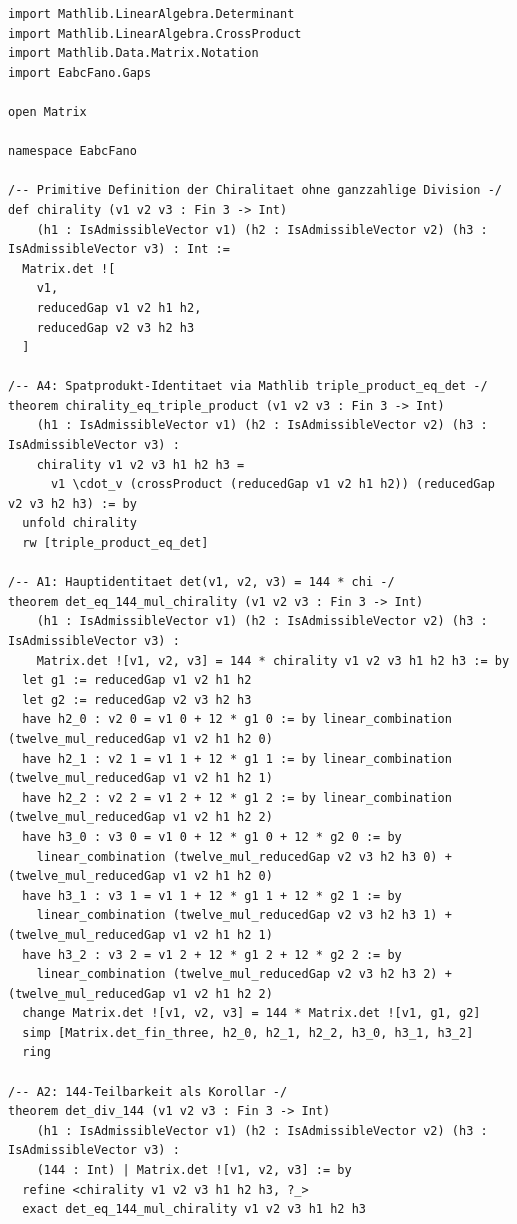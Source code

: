 \documentclass[11pt,a4paper]{article}
\theoremstyle{plain}
\theoremstyle{definition}
\theoremstyle{remark}
\begin{document}
\begin{lstlisting}[language=Lean4]
import Mathlib.LinearAlgebra.Determinant
import Mathlib.LinearAlgebra.CrossProduct
import Mathlib.Data.Matrix.Notation
import EabcFano.Gaps

open Matrix

namespace EabcFano

/-- Primitive Definition der Chiralitaet ohne ganzzahlige Division -/
def chirality (v1 v2 v3 : Fin 3 -> Int)
    (h1 : IsAdmissibleVector v1) (h2 : IsAdmissibleVector v2) (h3 : IsAdmissibleVector v3) : Int :=
  Matrix.det ![
    v1,
    reducedGap v1 v2 h1 h2,
    reducedGap v2 v3 h2 h3
  ]

/-- A4: Spatprodukt-Identitaet via Mathlib triple_product_eq_det -/
theorem chirality_eq_triple_product (v1 v2 v3 : Fin 3 -> Int)
    (h1 : IsAdmissibleVector v1) (h2 : IsAdmissibleVector v2) (h3 : IsAdmissibleVector v3) :
    chirality v1 v2 v3 h1 h2 h3 =
      v1 \cdot_v (crossProduct (reducedGap v1 v2 h1 h2)) (reducedGap v2 v3 h2 h3) := by
  unfold chirality
  rw [triple_product_eq_det]

/-- A1: Hauptidentitaet det(v1, v2, v3) = 144 * chi -/
theorem det_eq_144_mul_chirality (v1 v2 v3 : Fin 3 -> Int)
    (h1 : IsAdmissibleVector v1) (h2 : IsAdmissibleVector v2) (h3 : IsAdmissibleVector v3) :
    Matrix.det ![v1, v2, v3] = 144 * chirality v1 v2 v3 h1 h2 h3 := by
  let g1 := reducedGap v1 v2 h1 h2
  let g2 := reducedGap v2 v3 h2 h3
  have h2_0 : v2 0 = v1 0 + 12 * g1 0 := by linear_combination (twelve_mul_reducedGap v1 v2 h1 h2 0)
  have h2_1 : v2 1 = v1 1 + 12 * g1 1 := by linear_combination (twelve_mul_reducedGap v1 v2 h1 h2 1)
  have h2_2 : v2 2 = v1 2 + 12 * g1 2 := by linear_combination (twelve_mul_reducedGap v1 v2 h1 h2 2)
  have h3_0 : v3 0 = v1 0 + 12 * g1 0 + 12 * g2 0 := by
    linear_combination (twelve_mul_reducedGap v2 v3 h2 h3 0) + (twelve_mul_reducedGap v1 v2 h1 h2 0)
  have h3_1 : v3 1 = v1 1 + 12 * g1 1 + 12 * g2 1 := by
    linear_combination (twelve_mul_reducedGap v2 v3 h2 h3 1) + (twelve_mul_reducedGap v1 v2 h1 h2 1)
  have h3_2 : v3 2 = v1 2 + 12 * g1 2 + 12 * g2 2 := by
    linear_combination (twelve_mul_reducedGap v2 v3 h2 h3 2) + (twelve_mul_reducedGap v1 v2 h1 h2 2)
  change Matrix.det ![v1, v2, v3] = 144 * Matrix.det ![v1, g1, g2]
  simp [Matrix.det_fin_three, h2_0, h2_1, h2_2, h3_0, h3_1, h3_2]
  ring

/-- A2: 144-Teilbarkeit als Korollar -/
theorem det_div_144 (v1 v2 v3 : Fin 3 -> Int)
    (h1 : IsAdmissibleVector v1) (h2 : IsAdmissibleVector v2) (h3 : IsAdmissibleVector v3) :
    (144 : Int) | Matrix.det ![v1, v2, v3] := by
  refine <chirality v1 v2 v3 h1 h2 h3, ?_>
  exact det_eq_144_mul_chirality v1 v2 v3 h1 h2 h3
\end{lstlisting}
\end{document}
